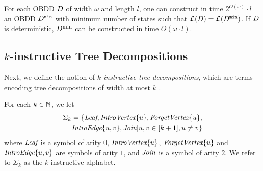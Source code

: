 \begin{theorem}\label{theorem:Minimize} 
For each OBDD $D$ of width $\omega$ and length $l$, one can construct in time $2^{O(\omega)}\cdot l$ an OBDD $D^{\texttt{min}}$ with minimum number of states such that $\mathcal{L}(D) = \mathcal{L}(D^{\texttt{min}})$. If $D$ is deterministic, $D^{\min}$ can be constructed in time $O(\omega\cdot l)$. 
\label{theorem:}
    
\end{theorem}

\subsection{$k$-instructive Tree Decompositions}
Next, we define the notion of $k$-\emph{instructive tree decompositions}, which are terms encoding tree decompositions of width at most $k$ \cite{From2023}. 

\begin{definition}
For each $k \in \mathbb{N}$, we let
\begin{align}
    \Sigma_k = \{\texttt{\it{Leaf}}, \texttt{\it{IntroVertex}}\{u\},\texttt{\it{ForgetVertex}}\{u\},\nonumber\\
    \texttt{\it{IntroEdge}}\{u,v\},\texttt{\it{Join}}| u,v\in [k+1],u\neq v\}
\end{align}
where $\texttt{\it{Leaf}}$ is a symbol of arity $0$, $\texttt{\it{IntroVertex}}\{u\}$, $\texttt{\it{ForgetVertex}}\{u\}$ and $\texttt{\it{IntroEdge}}\{u,v\}$ are symbols of arity $1$, and $\texttt{\it{Join}}$ is a symbol of arity $2$. We refer to $\Sigma_k$ as the $k$-instructive alphabet.
\end{definition}

